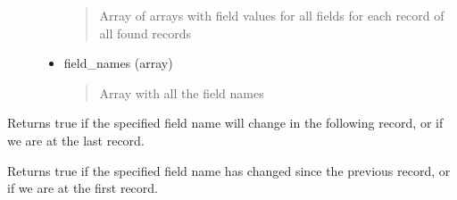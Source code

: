 \documentclass[letterpaper,10pt,english]{sphinxmanual}
\begin{document}
\begin{fulllineitems}
\begin{fulllineitems}
\begin{description}
\begin{itemize}
\begin{quote}
Array of arrays with field values for all fields for each record of all found records
\end{quote}

\item {} 
field\_names (array)
\begin{quote}

Array with all the field names
\end{quote}

\end{itemize}

\end{description}

\end{fulllineitems}


\begin{fulllineitems}
\label{knop_database:knop_databaserows.records_array}
\end{fulllineitems}



\begin{fulllineitems}
\end{fulllineitems}


\begin{fulllineitems}
\label{knop_database:knop_databaserows.size}
\end{fulllineitems}


\begin{fulllineitems}
\label{knop_database:knop_databaserows.summary_footer}
Returns true if the specified field name will change in the following record, or
if we are at the last record.

\end{fulllineitems}


\begin{fulllineitems}
\label{knop_database:knop_databaserows.summary_header}
Returns true if the specified field name has changed since the previous record,
or if we are at the first record.


\end{fulllineitems}
\end{fulllineitems}
\end{document}
